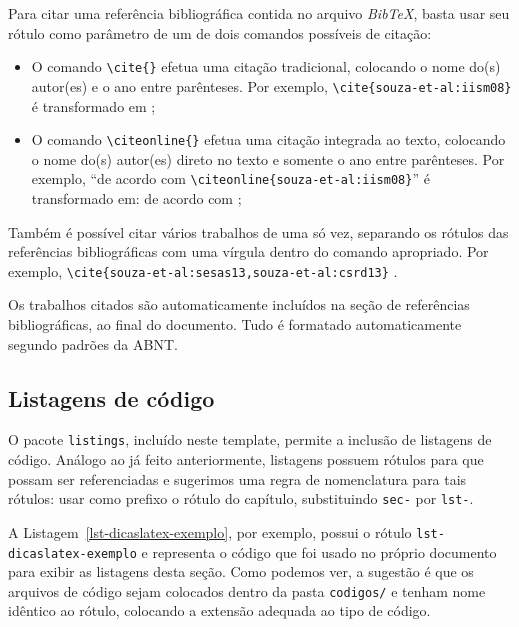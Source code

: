 Para citar uma referência bibliográfica contida no arquivo \emph{BibTeX}, basta usar seu rótulo como parâmetro de um de dois comandos possíveis de citação:

\begin{itemize}
\item O comando \texttt{\textbackslash cite\{\}} efetua uma citação tradicional, colocando o nome do(s) autor(es) e o ano entre parênteses. Por exemplo, \texttt{\textbackslash cite\{souza-et-al:iism08\}} é transformado em \cite{souza-et-al:iism08};

\item O comando \texttt{\textbackslash citeonline\{\}} efetua uma citação integrada ao texto, colocando o nome do(s) autor(es) direto no texto e somente o ano entre parênteses. Por exemplo, ``de acordo com \texttt{\textbackslash citeonline\{souza-et-al:iism08\}}'' é transformado em: de acordo com ;
\end{itemize}

Também é possível citar vários trabalhos de uma só vez, separando os rótulos das referências bibliográficas com uma vírgula dentro do comando apropriado. Por exemplo, \texttt{\textbackslash cite\{souza-et-al:sesas13,souza-et-al:csrd13\}} \cite{souza-et-al:sesas13,souza-et-al:csrd13}.

Os trabalhos citados são automaticamente incluídos na seção de referências bibliográficas, ao final do documento. Tudo é formatado automaticamente segundo padrões da ABNT.



\subsection{Listagens de código}
\label{sec-dicaslatex-listagens}

O pacote \texttt{listings}, incluído neste template, permite a inclusão de listagens de código. Análogo ao já feito anteriormente, listagens possuem rótulos para que possam ser referenciadas e sugerimos uma regra de nomenclatura para tais rótulos: usar como prefixo o rótulo do capítulo, substituindo \texttt{sec-} por \texttt{lst-}.

A Listagem~\ref{lst-dicaslatex-exemplo}, por exemplo, possui o rótulo \texttt{lst-dicaslatex-exemplo} e representa o código que foi usado no próprio documento para exibir as listagens desta seção. Como podemos ver, a sugestão é que os arquivos de código sejam colocados dentro da pasta \texttt{codigos/} e tenham nome idêntico ao rótulo, colocando a extensão adequada ao tipo de código.

